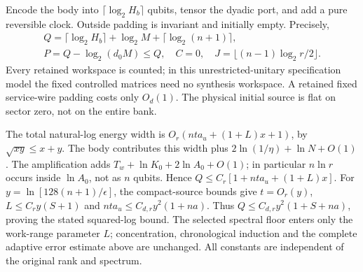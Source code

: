 Encode the body into $\lceil\log_2H_b\rceil$ qubits, tensor the dyadic
port, and add a pure reversible clock. Outside padding is invariant
and initially empty. Precisely,
\begin{gather*}
 Q=\lceil\log_2H_b\rceil+\log_2M+\lceil\log_2(n+1)\rceil,
 \\
 P=Q-\log_2(d_0M)\leq Q,\quad C=0,
 \quad J=\lfloor(n-1)\log_2r/2\rfloor.
\end{gather*}
Every retained workspace is counted; in this unrestricted-unitary
specification model the fixed controlled matrices need no synthesis
workspace. A retained fixed service-wire padding costs only $O_d(1)$.
The physical initial source is flat on sector zero, not on the entire bank.

The total natural-log energy width is
$O_r(nta_u+(1+L)x+1)$, by $\sqrt{xy}\leq x+y$.
The body contributes this width plus $2\ln(1/\eta)+\ln N+O(1)$.
The amplification adds $T_w+\ln K_0+2\ln A_0+O(1)$;
in particular $n\ln r$ occurs inside $\ln A_0$, not as $n$ qubits.
Hence $Q\leq C_r[1+nta_u+(1+L)x]$.
For $y=\ln[128(n+1)/\epsilon]$, the compact-source bounds give
$t=O_r(y)$, $L\leq C_r y(S+1)$ and
$nta_u\leq C_{d,r}y^2(1+na)$.
Thus $Q\leq C_{d,r}y^2(1+S+na)$, proving the stated squared-log
bound. The selected spectral floor enters only the work-range parameter
$L$; concentration, chronological induction and the complete adaptive
error estimate above are unchanged. All constants are independent of
the original rank and spectrum.
